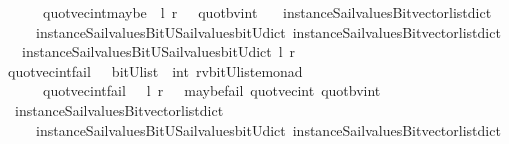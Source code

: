 \begin{isabellebody}
\ \ \ \ \ {\isachardoublequoteopen}\ quot{\isacharunderscore}vec{\isacharunderscore}int{\isacharunderscore}maybe\ \ l\ r\ {\isacharequal}\ {\isacharparenleft}\ quot{\isacharunderscore}bv{\isacharunderscore}int\ \isanewline
\ \ {\isacharparenleft}instance{\isacharunderscore}Sail{}{\isacharunderscore}values{\isacharunderscore}Bitvector{\isacharunderscore}list{\isacharunderscore}dict\isanewline
\ \ \ \ \ instance{\isacharunderscore}Sail{}{\isacharunderscore}values{\isacharunderscore}BitU{\isacharunderscore}Sail{}{\isacharunderscore}values{\isacharunderscore}bitU{\isacharunderscore}dict{\isacharparenright}\ {\isacharparenleft}instance{\isacharunderscore}Sail{}{\isacharunderscore}values{\isacharunderscore}Bitvector{\isacharunderscore}list{\isacharunderscore}dict\isanewline
\ \ \ instance{\isacharunderscore}Sail{}{\isacharunderscore}values{\isacharunderscore}BitU{\isacharunderscore}Sail{}{\isacharunderscore}values{\isacharunderscore}bitU{\isacharunderscore}dict{\isacharparenright}\ l\ r\ {\isacharparenright}{\isachardoublequoteclose}\isanewline
\isanewline
{}\isamarkupfalse%
\ quot{\isacharunderscore}vec{\isacharunderscore}int{\isacharunderscore}fail\ \ {\isacharcolon}{\isacharcolon}\ {\isachardoublequoteopen}{\isacharparenleft}bitU{\isacharparenright}list\ {\isasymRightarrow}\ int\ {\isasymRightarrow}{\isacharparenleft}{\isacharprime}rv{\isacharcomma}{\isacharparenleft}{\isacharparenleft}bitU{\isacharparenright}list{\isacharparenright}{\isacharcomma}{\isacharprime}e{\isacharparenright}monad\ {\isachardoublequoteclose}\ \ \ \isanewline
\ \ \ \ \ {\isachardoublequoteopen}\ quot{\isacharunderscore}vec{\isacharunderscore}int{\isacharunderscore}fail\ \ \ l\ r\ {\isacharequal}\ {\isacharparenleft}\ maybe{\isacharunderscore}fail\ {\isacharparenleft}{\isacharprime}{\isacharprime}quot{\isacharunderscore}vec{\isacharunderscore}int{\isacharprime}{\isacharprime}{\isacharparenright}\ {\isacharparenleft}quot{\isacharunderscore}bv{\isacharunderscore}int\ \isanewline
\ \ {\isacharparenleft}instance{\isacharunderscore}Sail{}{\isacharunderscore}values{\isacharunderscore}Bitvector{\isacharunderscore}list{\isacharunderscore}dict\isanewline
\ \ \ \ \ instance{\isacharunderscore}Sail{}{\isacharunderscore}values{\isacharunderscore}BitU{\isacharunderscore}Sail{}{\isacharunderscore}values{\isacharunderscore}bitU{\isacharunderscore}dict{\isacharparenright}\ {\isacharparenleft}instance{\isacharunderscore}Sail{}{\isacharunderscore}values{\isacharunderscore}Bitvector{\isacharunderscore}list{\isacharunderscore}dict\isanewline

\end{isabellebody}

